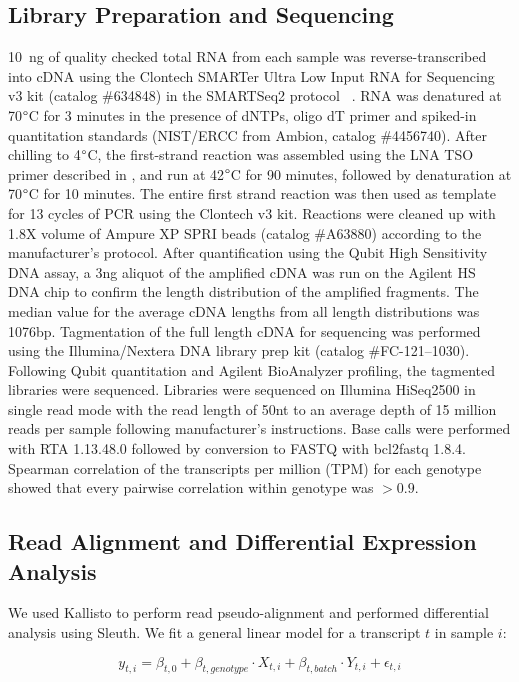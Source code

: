 \documentclass[9pt,twocolumn,twoside]{pnas-new}
\begin{document}
{\subsection*{Library Preparation and Sequencing}
10~ng of quality checked total RNA from each sample was
reverse-transcribed into cDNA using the Clontech SMARTer Ultra Low Input RNA for
Sequencing v3 kit (catalog \#634848) in the SMARTSeq2 protocol
~\cite{Picelli2014}.  RNA was denatured at 70$\degree{}$C for 3 minutes
in the presence of dNTPs, oligo dT primer and spiked-in quantitation standards
(NIST/ERCC from Ambion, catalog \#4456740).  After chilling to 4$\degree{}$C, the
first-strand reaction was assembled using the LNA TSO primer described in \citep{Picelli2014},
and run at 42$\degree{}$C for 90 minutes, followed by denaturation at 70$\degree{}$C for 10
minutes.  The entire first strand reaction was then used as template for 13
cycles of PCR using the Clontech v3 kit. Reactions were cleaned up with 1.8X
volume of Ampure XP SPRI beads (catalog \#A63880) according to the manufacturer’s
protocol.  After quantification using the Qubit High Sensitivity DNA assay, a 3ng
aliquot of the amplified cDNA was run on the Agilent HS DNA chip to confirm the
length distribution of the amplified fragments.  The median value for the
average cDNA lengths from all length distributions was 1076bp.  Tagmentation of
the full length cDNA for sequencing was performed using the Illumina/Nextera DNA
library prep kit (catalog \#FC-121--1030).  Following Qubit quantitation and
Agilent BioAnalyzer profiling, the tagmented libraries were sequenced.
Libraries were sequenced on Illumina HiSeq2500 in single read mode with the read
length of 50nt to an average depth of 15 million reads per sample following
manufacturer's instructions. Base calls were performed with RTA 1.13.48.0
followed by conversion to FASTQ with bcl2fastq 1.8.4. Spearman correlation of
the transcripts per million (TPM) for each genotype showed that every pairwise
correlation within genotype was $>0.9$.

\subsection*{Read Alignment and Differential Expression Analysis}
We used Kallisto to perform read pseudo-alignment and performed differential
analysis using Sleuth. We fit a general linear model for a transcript $t$ in
sample $i$:

\begin{equation}
  y_{t,i} = \beta_{t, 0} + \beta_{t, genotype}\cdot{}X_{t, i} +
  \beta_{t, batch}\cdot{}Y_{t, i} + \epsilon_{t, i}
\end{equation}

}
\end{document}
